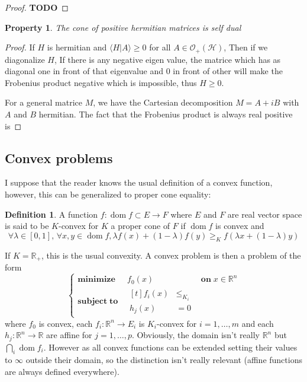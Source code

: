 \documentclass[10pt]{report}
\theoremstyle{plain}
\newtheorem{prop}[thm]{Property}
\theoremstyle{definition}
\newtheorem{defn}{Definition}[chapter]
\theoremstyle{remark}
\newcommand{\R}{\ensuremath{\mathbb{R}}}
\newcommand{\TODO}{\textbf{TODO}}
\renewcommand{\geq}{\geqslant}
\renewcommand{\leq}{\leqslant}
\DeclareMathOperator{\dom}{dom}
\newcommand{\minima}[3]{\begin{cases}
    \mathbf{minimize}\;\,\quad #1& \mathbf{on}\; #2\\
    \mathbf{subject\;to}\quad \begin{aligned}[t]#3\end{aligned}
  \end{cases}}
\begin{document}
\begin{proof}
  \TODO{}
\end{proof}

\begin{prop}
  The cone of positive hermitian matrices is self dual
\end{prop}

\begin{proof}
  If $H$ is hermitian and $\langle H | A \rangle \geq 0$ for all $A \in
  \mathcal{O}_+(\mathcal{H})$, Then if we diagonalize $H$, If there is any
  negative eigen value, the matrice which has as diagonal one in front of that
  eigenvalue and 0 in front of other will make the Frobenius product negative
  which is impossible, thus $H \geq 0$.

  For a general matrice $M$, we have the Cartesian decomposition $M = A + iB$
  with $A$ and $B$ hermitian. The fact that the Frobenius product is always real positive is

\end{proof}


\subsection{Convex problems}

I suppose that the reader knows the usual definition of a convex function,
however, this can be generalized to proper cone equality:

\begin{defn}
  A function $f : \dom f \subset E \to F$ where $E$ and $F$ are real vector
  space is said to be $K$-convex for $K$ a proper cone of $F$ if $\dom f$ is
  convex and
  \[\forall \lambda \in [0,1],\, \forall x,y \in \dom f, \lambda f(x) + (1 -
    \lambda)f(y) \geq_K f(\lambda x + (1-\lambda)y)\]
\end{defn}

If $K = \R_+$, this is the usual convexity. A convex problem is then a problem
of the form
\begin{equation}\label{eqn:stdprb}
\minima{f_0(x)}{x \in \R^n}{f_i(x) &\leq_{K_i} \\ \!\!h_j(x) &= 0}
\end{equation}
where $f_0$ is convex, each $f_i : \R^n \to E_i$ is $K_i$-convex for $i = 1,\ldots,m$ and each
$h_j : \R^n \to \R$ are affine for $j = 1,\ldots,p$. Obviously, the domain isn't really $\R^n$
but $\bigcap_i \dom f_i$. However as all convex
functions can be extended setting their values to $\infty$ outside their domain,
so the distinction isn't really relevant (affine functions are always defined
everywhere).
\end{document}
